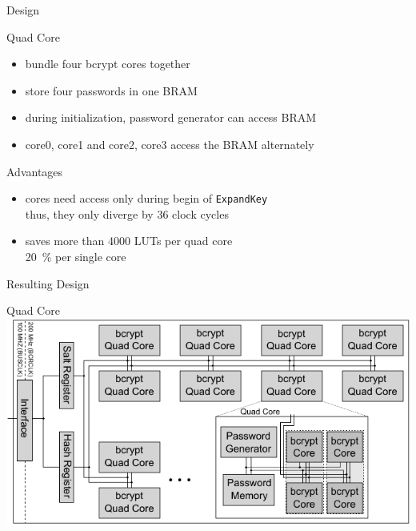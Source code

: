 \begin{frame}{Design}
    \begin{block}{Quad Core}
      \begin{itemize}
        \item bundle four bcrypt cores together
        \item store four passwords in one BRAM
        \item during initialization, password generator can access BRAM
        \item core0, core1 and core2, core3 access the BRAM alternately
      \end{itemize}
    \end{block}
    \begin{exampleblock}{Advantages}
      \begin{itemize}
        \item cores need access only during begin of \texttt{ExpandKey}\\thus,
              they only diverge by 36 clock cycles
        \item saves more than 4000 LUTs per quad core\\
              \SI{20}{\percent} per single core
      \end{itemize}
    \end{exampleblock}
\end{frame}

\begin{frame}{Resulting Design}
    \begin{block}{Quad Core}
    \center \includegraphics[width=.90\textwidth]{data/bcrypt_design_overview.pdf}
    \end{block}
\end{frame}

